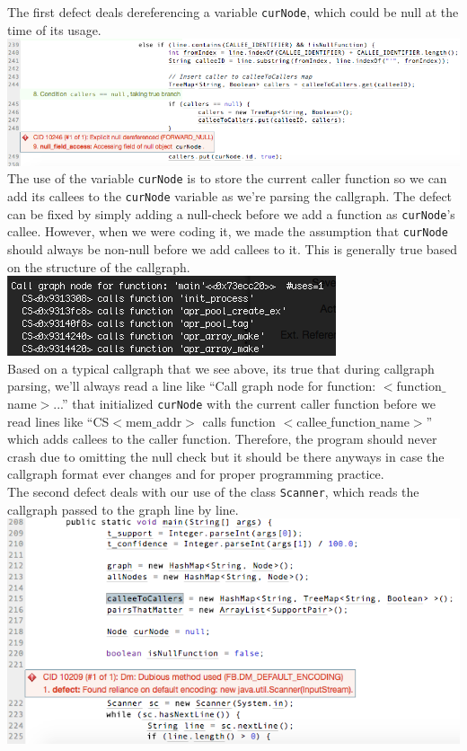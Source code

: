 \documentclass{article}
\begin{document}
The first defect deals dereferencing a variable \verb|curNode|, which could be null at the time of its usage. \\
\includegraphics[scale=0.5]{ss/bug_null_dereference.png} \\
The use of the variable \verb|curNode| is to store the current caller function so we can add its callees to the \verb|curNode| variable as we're parsing the callgraph. The defect can be fixed by simply adding a null-check before we add a function as \verb|curNode|'s callee. However, when we were coding it, we made the assumption that \verb|curNode| should always be non-null before we add callees to it. This is generally true based on the structure of the callgraph. \\
\includegraphics[scale=0.5]{ss/example_callgraph.png} \\
Based on a typical callgraph that we see above, its true that during callgraph parsing, we'll always read a line like ``Call graph node for function: $<$function$\_$name$>$...'' that initialized \verb|curNode| with the current caller function before we read lines like ``CS$<$mem$\_$addr$>$ calls function $<$callee$\_$function$\_$name$>$'' which adds callees to the caller function. Therefore, the program should never crash due to omitting the null check but it should be there anyways in case the callgraph format ever changes and for proper programming practice. \\

The second defect deals with our use of the class \verb|Scanner|, which reads the callgraph passed to the graph line by line. \\
\includegraphics[scale=0.5]{ss/bug_dubious_method.png} \\
\end{document}
